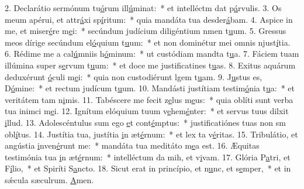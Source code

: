 2. Declarátio sermónum tu\uline{ó}rum ill\uline{ú}minat:~* et intelléctm dat p\uline{á}rvulis.
3. Os meum apérui, et attr\uline{á}xi sp\uline{í}ritum:~* quia mandáta tua desder\uline{á}bam.
4. Aspice in me, et miser\uline{é}re m\uline{e}i:~* secúndum judícium diligéntium nmen t\uline{u}um.
5. Gressus meos dírige secúndum el\uline{ó}quium t\uline{u}um:~* et non dominétur mei omnis njust\uline{í}tia.
6. Rédime me a cal\uline{ú}mniis h\uline{ó}minum:~* ut custódiam mandta t\uline{u}a.
7. Fáciem tuam illúmina super s\uline{e}rvum t\uline{u}um:~* et doce me justificatines t\uline{u}as.
8. Exitus aquárum deduxérunt \uline{ó}culi m\uline{e}i:~* quia non custodiérunt lgem t\uline{u}am.
9. J\uline{u}stus es, D\uline{ó}mine:~* et rectum judícum t\uline{u}um.
10. Mandásti justítiam testim\uline{ó}nia t\uline{u}a:~* et veritátem tam n\uline{i}mis.
11. Tabéscere me fecit z\uline{e}lus m\uline{e}us:~* quia oblíti sunt verba tua inimci m\uline{e}i.
12. Ignítum elóquium tuum v\uline{e}hem\uline{é}nter:~* et servus tuus dilxit \uline{i}llud.
13. Adolescéntulus sum ego \uline{e}t cont\uline{é}mptus:~* justificatiónes tuas non sm obl\uline{í}tus.
14. Justítia tua, justítia \uline{i}n æt\uline{é}rnum:~* et lex ta v\uline{é}ritas.
15. Tribulátio, et angústia \uline{i}nven\uline{é}runt me:~* mandáta tua meditáto m\uline{e}a est.
16. Æquitas testimónia tua \uline{i}n æt\uline{é}rnum:~* intelléctum da mih, et v\uline{i}vam.
17. Glória P\uline{a}tri, et F\uline{í}lio,~* et Spiríti S\uline{a}ncto.
18. Sicut erat in princípio, et n\uline{u}nc, et s\uline{e}mper,~* et in sǽcula sæculrum. \uline{A}men.
